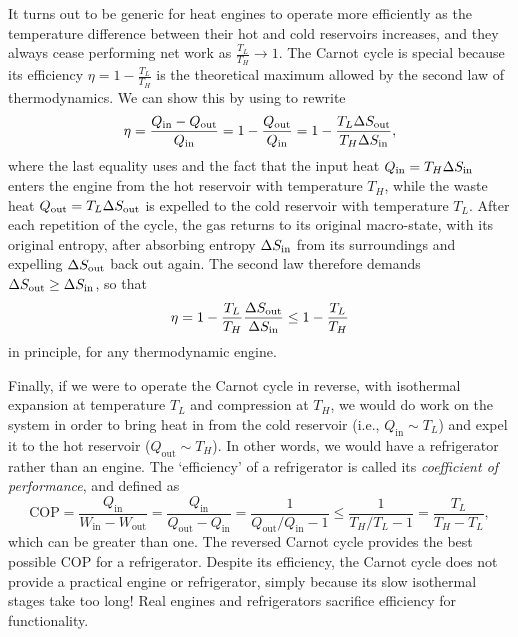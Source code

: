 It turns out to be generic for heat engines to operate more efficiently as the temperature difference between their hot and cold reservoirs increases, and they always cease performing net work as $\frac{T_L}{T_H} \to 1$.
The Carnot cycle is special because its efficiency $\eta = 1 - \frac{T_L}{T_H}$ is the theoretical maximum allowed by the second law of thermodynamics.
We can show this by using  to rewrite
\begin{equation*}
  \eta = \frac{Q_{\text{in}} - Q_{\text{out}}}{Q_{\text{in}}} = 1 - \frac{Q_{\text{out}}}{Q_{\text{in}}} = 1 - \frac{T_L \Delta S_{\text{out}}}{T_H \Delta S_{\text{in}}},
\end{equation*}
where the last equality uses  and the fact that the input heat $Q_{\text{in}} = T_H \Delta S_{\text{in}}$ enters the engine from the hot reservoir with temperature $T_H$, while the waste heat $Q_{\text{out}} = T_L \Delta S_{\text{out}}$ is expelled to the cold reservoir with temperature $T_L$.
After each repetition of the cycle, the gas returns to its original macro-state, with its original entropy, after absorbing entropy $\Delta S_{\text{in}}$ from its surroundings and expelling $\Delta S_{\text{out}}$ back out again.
The second law therefore demands $\Delta S_{\text{out}} \geq \Delta S_{\text{in}}$, so that
\begin{equation*}
  \eta = 1 - \frac{T_L}{T_H} \frac{\Delta S_{\text{out}}}{\Delta S_{\text{in}}} \leq 1 - \frac{T_L}{T_H}
\end{equation*}
in principle, for any thermodynamic engine. %

Finally, if we were to operate the Carnot cycle in reverse, with isothermal expansion at temperature $T_L$ and compression at $T_H$, we would do work on the system in order to bring heat in from the cold reservoir (i.e., $Q_{\text{in}} \sim T_L$) and expel it to the hot reservoir ($Q_{\text{out}} \sim T_H$).
In other words, we would have a refrigerator rather than an engine.
The `efficiency' of a refrigerator is called its \textit{coefficient of performance}, and defined as
\begin{equation*}
  \mathrm{COP} = \frac{Q_{\text{in}}}{W_{\text{in}} - W_{\text{out}}} = \frac{Q_{\text{in}}}{Q_{\text{out}} - Q_{\text{in}}} = \frac{1}{Q_{\text{out}} / Q_{\text{in}} - 1} \leq \frac{1}{T_H / T_L - 1} = \frac{T_L}{T_H - T_L},
\end{equation*}
which can be greater than one.
The reversed Carnot cycle provides the best possible $\mathrm{COP}$ for a refrigerator.
Despite its efficiency, the Carnot cycle does not provide a practical engine or refrigerator, simply because its slow isothermal stages take too long!
Real engines and refrigerators sacrifice efficiency for functionality.
